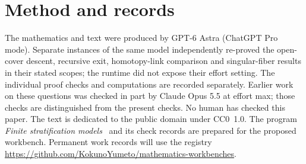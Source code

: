 \documentclass[11pt,a4paper]{article}
\theoremstyle{definition}
\newcommand{\recordurl}{https://github.com/KokunoYumeto/mathematics-workbenches}
\begin{document}
\section*{Method and records}
The mathematics and text were produced by GPT-6 Astra (ChatGPT Pro mode). Separate instances of the same model independently re-proved the open-cover descent, recursive exit, homotopy-link comparison and singular-fiber results in their stated scopes; the runtime did not expose their effort setting. The individual proof checks and computations are recorded separately. Earlier work on these questions was checked in part by Claude Opus 5.5 at effort max; those checks are distinguished from the present checks. No human has checked this paper. The text is dedicated to the public domain under CC0~1.0. The program \emph{Finite stratification models}~\cite{FiniteStratificationModels} and its check records are prepared for the proposed workbench. Permanent work records will use the registry \url{\recordurl}.
\end{document}
